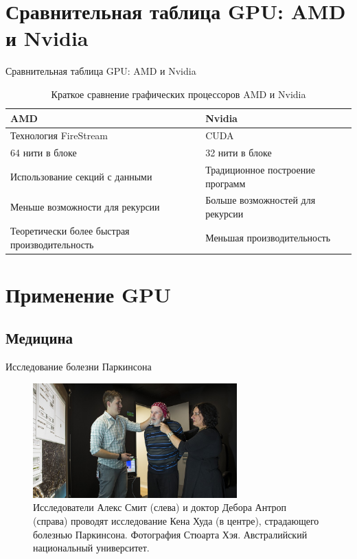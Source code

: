 \documentclass{beamer}
\begin{document}
\section{Сравнительная таблица GPU: AMD и Nvidia}

\begin{frame}{Сравнительная таблица GPU: AMD и Nvidia}

\begin{table}
\begin{center}
\begin{tabular}{|p{5cm}|p{5cm}|}
\hline
AMD & Nvidia \\ \hline
Технология FireStream & CUDA \\ \hline
64 нити в блоке & 32 нити в блоке \\ \hline
Использование секций с данными & Традиционное построение программ \\ \hline
Меньше возможности для рекурсии & Больше возможностей для рекурсии \\ \hline
Теоретически более быстрая производительность & Меньшая производительность \\ 
\hline
\end{tabular}

\end{center}
\caption{Краткое сравнение графических процессоров AMD и Nvidia}
\end{table}

\end{frame}

\section{Применение GPU}

\subsection{Медицина}

\begin{frame}{Исследование болезни Паркинсона}

\begin{figure}
\center
\includegraphics[width=0.7\textwidth]{Images/parkinson.jpg}
\caption{\label{fig:parkinson}Исследователи Алекс Смит (слева) и доктор Дебора Антроп (справа) проводят исследование Кена Худа (в центре), страдающего болезнью Паркинсона. Фотография Стюарта Хэя. Австралийский национальный университет.}
\end{figure}

\end{frame}
\end{document}
